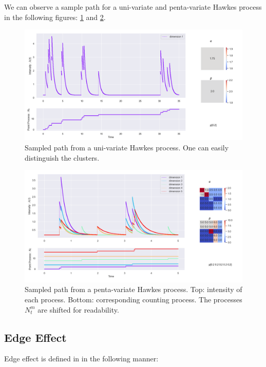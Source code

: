 We can observe a sample path for a uni-variate and penta-variate Hawkes process in the following figures: \ref{fig:hawkes1} and \ref{fig:hawkes5}.

\begin{figure}
\centering
\includegraphics[width = 0.99 \textwidth]{../imag/chap1/hawkes1.png}
\caption{Sampled path from a uni-variate Hawkes process. One can easily distinguish the clusters.}
\label{fig:hawkes1}
\end{figure}


\begin{figure}
\centering
\includegraphics[width = 0.99 \textwidth]{../imag/chap1/hawkes5.png}
\caption{Sampled path from a penta-variate Hawkes process. Top: intensity of each process. Bottom: corresponding counting process. The processes $N_t^m$ are shifted for readability.}
\label{fig:hawkes5}
\end{figure}

\subsection{Edge Effect}
\label{subsection:edge}
Edge effect is defined in \cite{socialhawkes} in the following manner:

